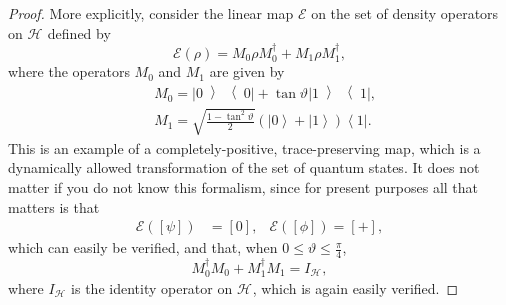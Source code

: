 \documentclass[DIV=calc,fontsize=12pt]{scrartcl} %
\theoremstyle{definition}
\theoremstyle{plain}
\newcommand{\Ket}[1]{\ensuremath{\left \vert #1 \right \rangle}}
\newcommand{\Bra}[1]{\ensuremath{\left \langle #1 \right \vert}}
\newcommand{\KetBra}[2]{\ensuremath{\left \vert #1 \middle \rangle
\middle \langle #2 \right \vert}}
\newcommand{\Proj}[1]{\ensuremath{\left [ #1 \right ]}}
\newcommand{\Hilb}[1][]{\ensuremath{\mathcal{H}_{#1}}}
\begin{document}
\begin{proof}
More explicitly, consider the linear map $\mathcal{E}$ on the set of
density operators on $\Hilb$ defined by
\begin{equation}
\mathcal{E}(\rho) = M_0 \rho M_0^{\dagger} + M_1 \rho M_1^{\dagger},
\end{equation}
where the operators $M_0$ and $M_1$ are given by
\begin{align}
& M_0 = \KetBra{0}{0} + \tan \vartheta \KetBra{1}{1},\\
& M_1 = \sqrt{\frac{1 - \tan^2 \vartheta}{2}}\left ( \Ket{0} + \Ket{1} \right ) \Bra{1}.
\end{align}
This is an example of a completely-positive, trace-preserving map,
which is a dynamically allowed transformation of the set of quantum
states.  It does not matter if you do not know this formalism, since
for present purposes all that matters is that
\begin{align}
\label{eq:Main:incip}
\mathcal{E}(\Proj{\psi}) & = \Proj{0}, & \mathcal{E}(\Proj{\phi})
= \Proj{+},
\end{align}
which can easily be verified, and that, when $0 \leq \vartheta \leq
\frac{\pi}{4}$,
\begin{equation}
\label{eq:Main:idsum}
M_0^{\dagger}M_0 + M_1^{\dagger}M_1 = I_{\Hilb},
\end{equation}
where $I_{\Hilb}$ is the identity operator on $\Hilb$, which is
again easily verified.


\end{proof}
\end{document}
